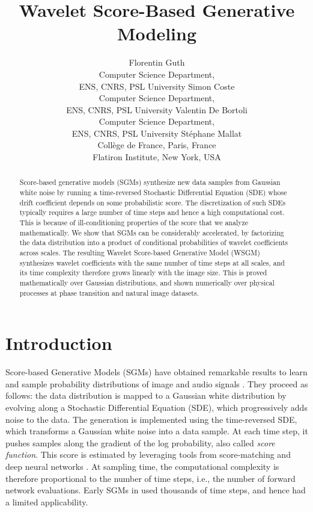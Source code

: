 \documentclass{article}
\title{Wavelet Score-Based Generative Modeling}
\author{%
  Florentin Guth \\
    Computer Science Department, \\
  ENS, CNRS, PSL University
  \And
  Simon Coste
  \\
    Computer Science Department, \\
  ENS, CNRS, PSL University
  \AND
  Valentin De Bortoli \\
    Computer Science Department, \\
  ENS, CNRS, PSL University  
  \And
  St\'ephane Mallat \\
 Collège de France, Paris, France \\
Flatiron Institute, New York, USA }
\begin{document}
\maketitle
\begin{abstract}
Score-based generative models (SGMs) synthesize new data samples from Gaussian white noise by running a time-reversed Stochastic Differential Equation (SDE) whose drift coefficient depends on some probabilistic score. The discretization of such SDEs typically requires a large number of time steps and hence a high computational cost. This is because of ill-conditioning properties of the score that we analyze mathematically. We show that SGMs can be considerably accelerated, by factorizing the data distribution into a product of conditional probabilities of wavelet coefficients across scales. The resulting Wavelet Score-based Generative Model (WSGM) synthesizes wavelet coefficients with the same number of time steps at all scales, and its time complexity therefore grows linearly with the image size. This is proved mathematically over Gaussian distributions, and shown numerically over physical processes at phase transition and natural image datasets.
\end{abstract}


\section{Introduction}
\label{sec:intro}

Score-based Generative Models (SGMs) have obtained remarkable results to learn
and sample probability distributions of image and audio signals
 \citep{song2019generative,nichol2021improved,nichol2021beatgans}.
They proceed as follows: the data distribution is mapped to a Gaussian white
distribution by evolving along a Stochastic Differential Equation (SDE), which
progressively adds noise to the data.  The generation is implemented using the
time-reversed SDE, which transforms a Gaussian white noise into a data sample.
At each time step, it pushes samples along the gradient of the log probability,
also called \emph{score function}.  This score is estimated by leveraging tools
from score-matching and deep neural networks
\citep{hyvarinen2005estimation,vincent2011connection}.  At sampling time, the
computational complexity is therefore proportional to the number of time steps,
i.e., the number of forward network evaluations.  Early SGMs in
\cite{song2019generative,song2020score,ho2020denoising} used thousands of time
steps, and hence had a limited applicability.
\end{document}
